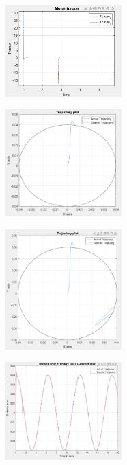 \documentclass[conference]{IEEEtran}
\begin{document}
\begin{figure}[htbp]
\centerline{\includegraphics[width=0.4\textwidth]{DRFPMTLQR.png}}
\caption{}
\label{fig}
\end{figure}
\begin{figure}[htbp]
\centerline{\includegraphics[width=0.4\textwidth]{CTLQR.png}}
\caption{}
\label{fig}
\end{figure}
\begin{figure}[htbp]
\centerline{\includegraphics[width=0.4\textwidth]{DRCTLQR.png}}
\caption{}
\label{fig}
\end{figure}
\begin{figure}[htbp]
\centerline{\includegraphics[width=0.4\textwidth]{DRCTELQR.png}}
\caption{}
\label{fig}
\end{figure}
\end{document}
